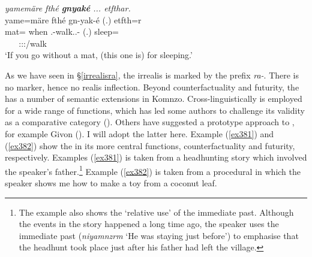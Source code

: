 \begin{exe}
	\ex \emph{yamemäre fthé \textbf{gnyaké} ... etfthar.}\\
	\glll yame=märe fthé gn-yak-é (.) etfth=r\\
	mat={\Priv} when \Stsg.\Bet-walk.\Ext.\Ndu-{\Imp} (.) sleep=\Purp\\
	~ ~ {\footnotesize \Ssg:\Sbj:\Imp:\Ipfv/walk} ~ ~\\
	\trans `If you go without a mat, (this one is) for sleeping.'\\ 
	\label{ex318}
\end{exe}

As we have seen in {\S}\ref{irrealisra}, the irrealis is marked by the prefix \emph{ra-}. There is no  marker, hence no realis inflection. Beyond counterfactuality and futurity, the   has a number of semantic extensions in Komnzo. Cross-linguistically   is employed for a wide range of functions, which has led some authors to challenge its validity as a comparative category (\citealt{Bybee:irrealis}). Others have suggested a prototype approach to  , for example Givon (\citeyear[327]{Givon:1994ko}). I will adopt the latter here. Example (\ref{ex381}) and (\ref{ex382}) show the   in its more central functions, counterfactuality and futurity, respectively. Examples (\ref{ex381}) is taken from a headhunting story which involved the speaker's father.\footnote{The example also shows the `relative use' of the immediate past. Although the events in the story happened a long time ago, the speaker uses the immediate past (\emph{niyamnzrm} `He was staying just before') to emphasise that the headhunt took place just after his father had left the village.} Example (\ref{ex382}) is taken from a procedural in which the speaker shows me how to make a toy from a coconut leaf.

